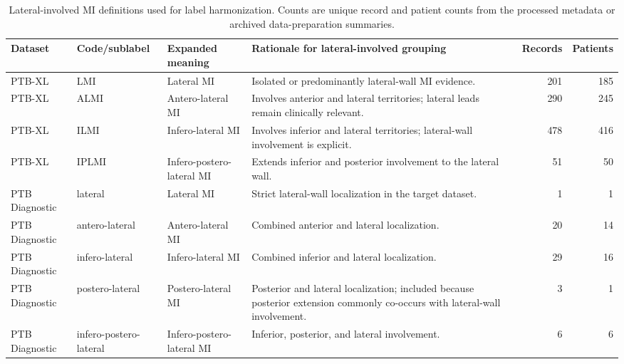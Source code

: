 \documentclass[a4paper,fleqn]{cas-dc}
\begin{document}
\begin{table}[!t]
\centering
\caption{Lateral-involved MI definitions used for label harmonization. Counts are unique record and patient counts from the processed metadata or archived data-preparation summaries.}
\label{tab:lateral_involved_definition}
\begin{tabular*}{\textwidth}{@{\extracolsep{\fill}}p{} p{} p{} p{} r r@{}}
\toprule
\textbf{Dataset} & \textbf{Code/sublabel} & \textbf{Expanded meaning} & \textbf{Rationale for lateral-involved grouping} & \textbf{Records} & \textbf{Patients} \\
\midrule
PTB-XL & LMI & Lateral MI & Isolated or predominantly lateral-wall MI evidence. & 201 & 185 \\
PTB-XL & ALMI & Antero-lateral MI & Involves anterior and lateral territories; lateral leads remain clinically relevant. & 290 & 245 \\
PTB-XL & ILMI & Infero-lateral MI & Involves inferior and lateral territories; lateral-wall involvement is explicit. & 478 & 416 \\
PTB-XL & IPLMI & Infero-postero-lateral MI & Extends inferior and posterior involvement to the lateral wall. & 51 & 50 \\
PTB Diagnostic & lateral & Lateral MI & Strict lateral-wall localization in the target dataset. & 1 & 1 \\
PTB Diagnostic & antero-lateral & Antero-lateral MI & Combined anterior and lateral localization. & 20 & 14 \\
PTB Diagnostic & infero-lateral & Infero-lateral MI & Combined inferior and lateral localization. & 29 & 16 \\
PTB Diagnostic & postero-lateral & Postero-lateral MI & Posterior and lateral localization; included because posterior extension commonly co-occurs with lateral-wall involvement. & 3 & 1 \\
PTB Diagnostic & infero-postero-lateral & Infero-postero-lateral MI & Inferior, posterior, and lateral involvement. & 6 & 6 \\
\bottomrule
\end{tabular*}
\end{table}
\end{document}
